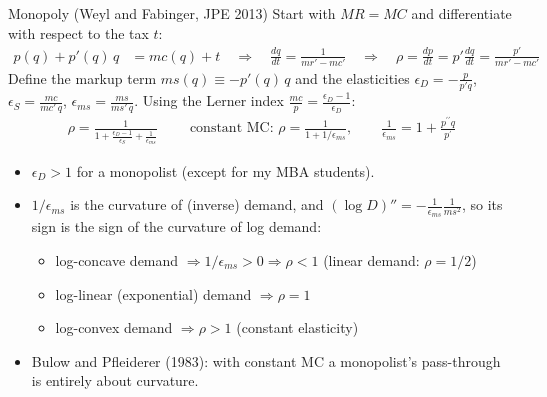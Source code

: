 \documentclass[aspectratio=169,10pt]{beamer}
\begin{document}
\begin{frame}{Monopoly (Weyl and Fabinger, JPE 2013)}
\footnotesize
Start with $MR = MC$ and differentiate with respect to the tax $t$:
\begin{align*}
p(q) + p'(q)\, q &= mc(q) + t
\quad \Rightarrow \quad \frac{dq}{dt} = \frac{1}{mr' - mc'}
\quad \Rightarrow \quad \rho = \frac{dp}{dt} = p'\frac{dq}{dt} = \frac{p'}{mr' - mc'}
\end{align*}
Define the markup term $ms(q) \equiv -p'(q)\, q$ and the elasticities $\epsilon_D = -\frac{p}{p' q}$, $\epsilon_S = \frac{mc}{mc'\, q}$, $\epsilon_{ms} = \frac{ms}{ms'\, q}$. Using the Lerner index $\frac{mc}{p} = \frac{\epsilon_D - 1}{\epsilon_D}$:
\begin{align*}
\boxed{\;\rho=\frac{1}{1+\frac{\epsilon_D-1}{\epsilon_S}+\frac{1}{\epsilon_{m s}}}\;}
\qquad\text{constant MC: } \rho = \frac{1}{1 + 1/\epsilon_{ms}}, \qquad
\frac{1}{\epsilon_{m s}}= 1+\frac{p^{\prime \prime} q}{p^{\prime}}
\end{align*}
\begin{itemize}
\item $\epsilon_D > 1$ for a monopolist (except for my MBA students).
\item $1/\epsilon_{ms}$ is the \alert{curvature} of (inverse) demand, and $(\log D)'' = -\frac{1}{\epsilon_{ms}} \frac{1}{ms^2}$, so its sign is the sign of the curvature of \alert{log demand}:
\begin{itemize}
\item log-concave demand $\Rightarrow 1/\epsilon_{ms} > 0 \Rightarrow \rho < 1$ (linear demand: $\rho = 1/2$)
\item log-linear (exponential) demand $\Rightarrow \rho = 1$
\item log-convex demand $\Rightarrow \rho > 1$ (constant elasticity)
\end{itemize}
\item Bulow and Pfleiderer (1983): with constant MC a monopolist's pass-through is \alert{entirely} about curvature.
\end{itemize}
\end{frame}
\end{document}
